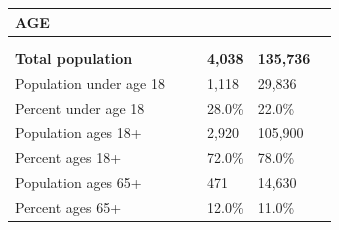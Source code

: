 \documentclass[9pt]{report}
\begin{document}
\vspace{24pt}
\setlength{\tabcolsep}{.01in} %
\begin{tabular}{p{.10in}p{.10in}p{.10in}p{3.7in}>{\hfill}p{.85in}>{\hfill}p{.85in}>{\hfill}p{.85in}>{\hfill}p{.85in}p{0.1in}}
\multicolumn{9}{l}{\parbox{7.1in}{\raggedright{\large{\strut\textbf{AGE}\strut}}}} \\ 
\hline
\multicolumn{4}{l}{\parbox{3.5in}{\raggedright{\textbf{}}}} & \multicolumn{1}{r}{\parbox{.85in}{\strut\raggedleft{\textbf{}\strut}}} & \multicolumn{1}{r}{\parbox{.85in}{\strut\raggedleft{\textbf{}\strut}}} & \multicolumn{1}{r}{\parbox{.85in}{\strut{}}} & \multicolumn{1}{r}{\parbox{.85in}{\strut{}}} & \\ 
\multicolumn{9}{l}{} \\ 
\multicolumn{4}{l}{\parbox{3.5in}{\strut\raggedright{\textbf{Total population}\strut}}} & \textbf{} & \textbf{} & \textbf{4,038} & \textbf{135,736} & \textbf{} \\ 
\multicolumn{4}{l}{\parbox{3.6in}{\strut\raggedright{{Population under age 18}}\strut}} &  &  & 1,118 & 29,836 & \multicolumn{1}{l}{}  \\ 
\multicolumn{4}{l}{\parbox{3.6in}{\strut\raggedright{{Percent under age 18}}\strut}} &  &  & 28.0\% & 22.0\% & \multicolumn{1}{l}{}  \\ 
\multicolumn{4}{l}{\parbox{3.6in}{\strut\raggedright{{Population ages 18+}}\strut}} &  &  & 2,920 & 105,900 & \multicolumn{1}{l}{}  \\ 
\multicolumn{4}{l}{\parbox{3.6in}{\strut\raggedright{{Percent ages 18+}}\strut}} &  &  & 72.0\% & 78.0\% & \multicolumn{1}{l}{}  \\ 
\multicolumn{4}{l}{\parbox{3.6in}{\strut\raggedright{{Population ages 65+}}\strut}} &  &  & 471 & 14,630 & \multicolumn{1}{l}{}  \\ 
\multicolumn{4}{l}{\parbox{3.6in}{\strut\raggedright{{Percent ages 65+}}\strut}} &  &  & 12.0\% & 11.0\% & \multicolumn{1}{l}{}  \\ 

\end{tabular}
\setlength{\tabcolsep}{6pt} %
\end{document}

